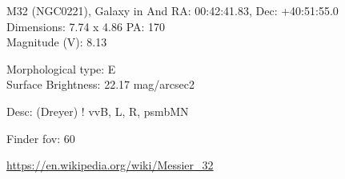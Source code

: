 \begin{block}{M32 (NGC0221), Galaxy in And}
    RA: 00:42:41.83, Dec: +40:51:55.0 \\ 
    Dimensions: 7.74 x 4.86 PA: 170 \\ 
    Magnitude (V): 8.13

    Morphological type: E \\ 
    Surface Brightness: 22.17 mag/arcsec2 

    Desc: (Dreyer) ! vvB, L, R, psmbMN 

    Finder fov: 60 

    \url{https://en.wikipedia.org/wiki/Messier_32} 
\end{block}